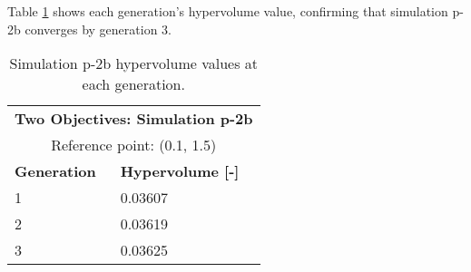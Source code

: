 Table \ref{tab:p2b-hypervolume} shows each generation's hypervolume value, 
confirming that simulation p-2b converges by generation 3. 
\begin{table}[htbp!]
    \centering
    \onehalfspacing
    \caption{Simulation p-2b hypervolume values at each generation.}
	\label{tab:p2b-hypervolume}
    \footnotesize
    \begin{tabular}{ll}
    \hline 
    \multicolumn{2}{c}{\textbf{Two Objectives: Simulation p-2b}} \\
    \multicolumn{2}{c}{Reference point: (0.1, 1.5)} \\
    \hline 
    \textbf{Generation} & \textbf{Hypervolume [-]} \\
    \hline
    1 & 0.03607 \\
    2 & 0.03619 \\
    3 & 0.03625 \\
    \hline
    \end{tabular}
\end{table}

